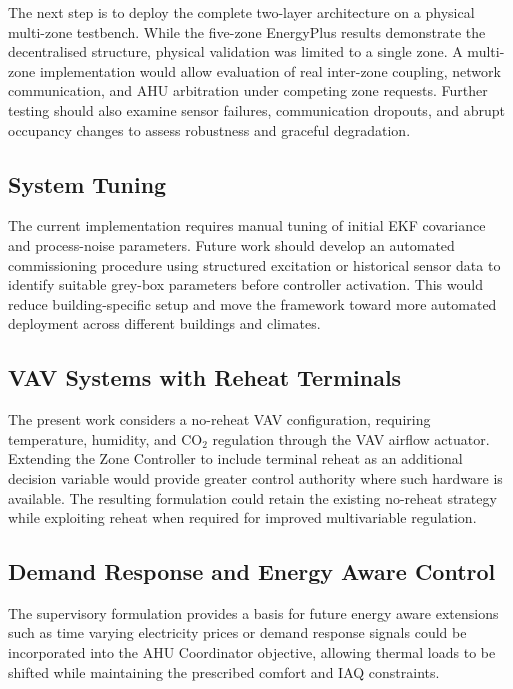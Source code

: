 \documentclass[12pt, a4paper]{article}
\begin{document}
The next step is to deploy the complete two-layer architecture on a physical multi-zone testbench. While the five-zone EnergyPlus results demonstrate the decentralised structure, physical validation was limited to a single zone. A multi-zone implementation would allow evaluation of real inter-zone coupling, network communication, and AHU arbitration under competing zone requests. Further testing should also examine sensor failures, communication dropouts, and abrupt occupancy changes to assess robustness and graceful degradation.

\subsection{System Tuning}

The current implementation requires manual tuning of initial EKF covariance and process-noise parameters. Future work should develop an automated commissioning procedure using structured excitation or historical sensor data to identify suitable grey-box parameters before controller activation. This would reduce building-specific setup and move the framework toward more automated deployment across different buildings and climates.

\subsection{VAV Systems with Reheat Terminals}

The present work considers a no-reheat VAV configuration, requiring temperature, humidity, and CO$_2$ regulation through the VAV airflow actuator. Extending the Zone Controller to include terminal reheat as an additional decision variable would provide greater control authority where such hardware is available. The resulting formulation could retain the existing no-reheat strategy while exploiting reheat when required for improved multivariable regulation.

\subsection{Demand Response and Energy Aware Control}

The supervisory formulation provides a basis for future energy aware extensions such as time varying electricity prices or demand response signals could be incorporated into the AHU Coordinator objective, allowing thermal loads to be shifted while maintaining the prescribed comfort and IAQ constraints.
	
\end{document}
